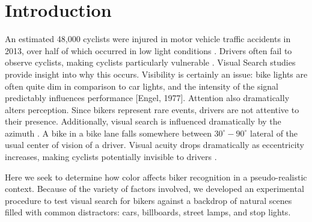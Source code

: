 \section{Introduction}



An estimated 48,000 cyclists were injured in motor vehicle traffic accidents in
2013, over half of which occurred in low light conditions \cite{nhtsa2015}.
Drivers often fail to observe cyclists, making cyclists particularly vulnerable
\cite{wood2013bicyclists}. Visual Search studies provide insight into why this occurs.
Visibility is certainly an issue: bike lights are often quite dim in comparison
to car lights, and the intensity of the signal predictably influences
performance [Engel, 1977]. Attention also dramatically alters perception. Since
bikers represent rare events, drivers are not attentive to their presence.
Additionally, visual search is influenced dramatically by the azimuth
\cite{treisman1980feature}. A bike in a bike lane falls somewhere between
$30^\circ-90^\circ$ lateral of the usual center of vision of a driver.
Visual acuity drops dramatically as eccentricity increases, making cyclists
potentially invisible to drivers \cite{wolfe1998there}. 

Here we seek to determine how color affects biker recognition in a
pseudo-realistic context. Because of the variety of factors involved, we
developed an experimental procedure to test visual search for bikers against a
backdrop of natural scenes filled with common distractors: cars, billboards,
street lamps, and stop lights.
